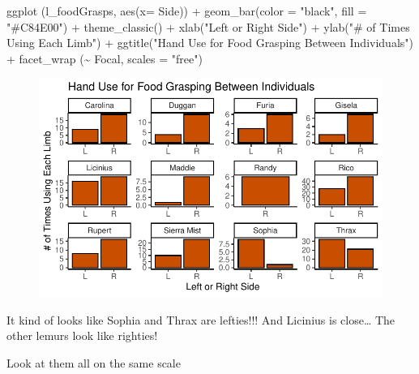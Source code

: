 \documentclass[
  letterpaper,
  DIV=11,
  numbers=noendperiod]{scrartcl}
\newenvironment{Shaded}{\begin{snugshade}}{\end{snugshade}}
\newcommand{\AttributeTok}[1]{\textcolor[rgb]{0.40,0.45,0.13}{#1}}
\newcommand{\FunctionTok}[1]{\textcolor[rgb]{0.28,0.35,0.67}{#1}}
\newcommand{\NormalTok}[1]{\textcolor[rgb]{0.00,0.23,0.31}{#1}}
\newcommand{\SpecialCharTok}[1]{\textcolor[rgb]{0.37,0.37,0.37}{#1}}
\newcommand{\StringTok}[1]{\textcolor[rgb]{0.13,0.47,0.30}{#1}}
\begin{document}
\begin{Shaded}
\begin{Highlighting}[]
\FunctionTok{ggplot}\NormalTok{ (l\_foodGrasps, }\FunctionTok{aes}\NormalTok{(}\AttributeTok{x=}\NormalTok{ Side)) }\SpecialCharTok{+}
  \FunctionTok{geom\_bar}\NormalTok{(}\AttributeTok{color =} \StringTok{"black"}\NormalTok{, }\AttributeTok{fill =} \StringTok{"\#C84E00"}\NormalTok{) }\SpecialCharTok{+}
  \FunctionTok{theme\_classic}\NormalTok{() }\SpecialCharTok{+}
  \FunctionTok{xlab}\NormalTok{(}\StringTok{"Left or Right Side"}\NormalTok{) }\SpecialCharTok{+}
  \FunctionTok{ylab}\NormalTok{(}\StringTok{"\# of Times Using Each Limb"}\NormalTok{) }\SpecialCharTok{+}
  \FunctionTok{ggtitle}\NormalTok{(}\StringTok{"Hand Use for Food Grasping Between Individuals"}\NormalTok{) }\SpecialCharTok{+}
  \FunctionTok{facet\_wrap}\NormalTok{ (}\SpecialCharTok{\textasciitilde{}}\NormalTok{ Focal, }\AttributeTok{scales =} \StringTok{"free"}\NormalTok{)}
\end{Highlighting}
\end{Shaded}

\begin{figure}[H]

{\centering \includegraphics{LeftyLemurs_files/figure-pdf/unnamed-chunk-32-1.pdf}

}

\end{figure}

It kind of looks like Sophia and Thrax are lefties!!! And Licinius is
close\ldots{} The other lemurs look like righties!

Look at them all on the same scale
\end{document}
